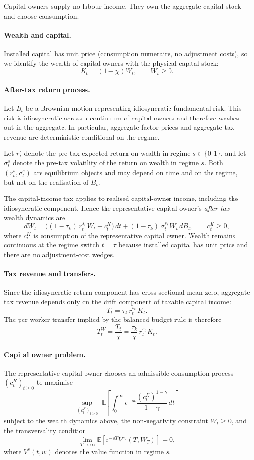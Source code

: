 \documentclass{article}
\begin{document}
Capital owners supply no labour income. They own the aggregate capital stock and choose consumption.

\paragraph{Wealth and capital.}
Installed capital has unit price (consumption numeraire, no adjustment costs), so we identify the wealth of capital owners with the physical capital stock:
$$
K_t = (1-\chi)W_t,
\qquad W_t \ge 0.
$$

\paragraph{After-tax return process.}
Let $B_t$ be a Brownian motion representing idiosyncratic fundamental risk. This risk is idiosyncratic across a continuum of capital owners and therefore washes out in the aggregate. In particular, aggregate factor prices and aggregate tax revenue are deterministic conditional on the regime.

Let $r_t^{s}$ denote the pre-tax expected return on wealth in regime $s \in \{0,1\}$, and let $\sigma_t^{s}$ denote the pre-tax volatility of the return on wealth in regime $s$. Both $(r_t^{s},\sigma_t^{s})$ are equilibrium objects and may depend on time and on the regime, but not on the realisation of $B_t$.

The capital-income tax applies to realised capital-owner income, including the idiosyncratic component. Hence the representative capital owner's \emph{after-tax} wealth dynamics are
$$
dW_t
=
\Big((1-\tau_k)\, r_t^{s_t}\, W_t - c^K_t\Big)\,dt
+
(1-\tau_k)\, \sigma_t^{s_t}\, W_t\, dB_t,
\qquad c^K_t \ge 0,
$$
where $c^K_t$ is consumption of the representative capital owner. Wealth remains continuous at the regime switch $t=\tau$ because installed capital has unit price and there are no adjustment-cost wedges.

\paragraph{Tax revenue and transfers.}
Since the idiosyncratic return component has cross-sectional mean zero, aggregate tax revenue depends only on the drift component of taxable capital income:
$$
T_t = \tau_k\, r_t^{s_t}\, K_t.
$$
The per-worker transfer implied by the balanced-budget rule is therefore
$$
T^W_t = \frac{T_t}{\chi} = \frac{\tau_k}{\chi}\, r_t^{s_t}\, K_t.
$$

\paragraph{Capital owner problem.}
The representative capital owner chooses an admissible consumption process $(c^K_t)_{t\ge 0}$ to maximise
$$
\sup_{(c^K_t)_{t\ge 0}}
\;
\mathbb{E}\left[\int_0^\infty e^{-\rho t}\frac{(c^K_t)^{1-\gamma}}{1-\gamma}\,dt\right]
$$
subject to the wealth dynamics above, the non-negativity constraint $W_t \ge 0$, and the transversality condition
$$
\lim_{T\to\infty}\mathbb{E}\left[e^{-\rho T} V^{s_T}(T,W_T)\right]=0,
$$
where $V^{s}(t,w)$ denotes the value function in regime $s$.
\end{document}
